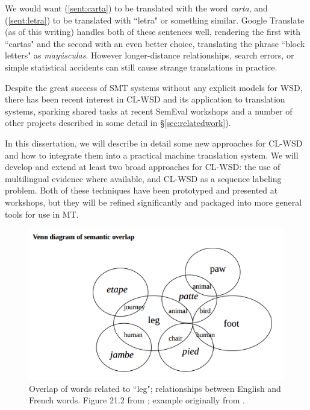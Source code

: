 We would want (\ref{sent:carta}) to be translated with the word \emph{carta},
and (\ref{sent:letra}) to be translated with ``letra" or something similar.
Google Translate (as of this writing) handles both of these sentences well,
rendering the first with ``cartas" and the second with an even better choice,
translating the phrase ``block letters" as \emph{mayúsculas}.
However longer-distance relationships, search errors, or simple statistical
accidents can still cause strange translations in practice.

Despite the great success of SMT systems without any explicit models for WSD,
there has been recent interest in CL-WSD and its application to translation
systems, sparking shared tasks at recent SemEval workshops
\cite{lefever-hoste:2010:SemEval,task10} and a number of other projects
described in some detail in \S\ref{sec:relatedwork}).

In this dissertation, we will describe in detail some new approaches for CL-WSD
and how to integrate them into a practical machine translation system.
We will develop and extend at least two broad approaches for CL-WSD: the use of
multilingual evidence where available, and CL-WSD as a sequence labeling
problem.
Both of these techniques have been prototyped and presented at workshops, but
they will be refined significantly and packaged into more general tools for use
in MT.  

\begin{figure}
  \includegraphics[width=12cm]{hutchins-leg-etc.png}
  \caption{Overlap of words related to ``leg"; relationships between English
  and French words. Figure 21.2 from \protect\cite{slp1}; example originally
  from \protect\cite[Chapter 6]{hutchins1992introduction}.}
  \label{fig:leg}
\end{figure}


